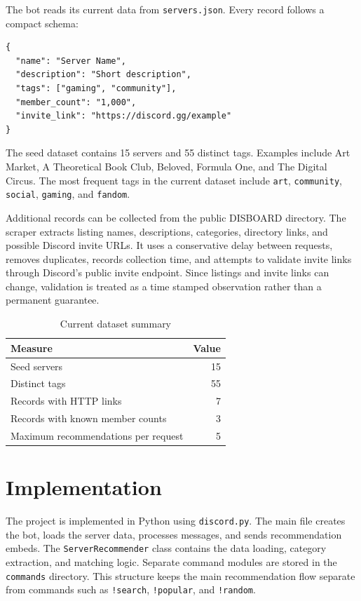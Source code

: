 \documentclass[11pt,a4paper]{article}
\begin{document}
The bot reads its current data from \texttt{servers.json}. Every record follows a compact schema:

\begin{lstlisting}
{
  "name": "Server Name",
  "description": "Short description",
  "tags": ["gaming", "community"],
  "member_count": "1,000",
  "invite_link": "https://discord.gg/example"
}
\end{lstlisting}

The seed dataset contains 15 servers and 55 distinct tags. Examples include Art Market, A Theoretical Book Club, Beloved, Formula One, and The Digital Circus. The most frequent tags in the current dataset include \texttt{art}, \texttt{community}, \texttt{social}, \texttt{gaming}, and \texttt{fandom}.

Additional records can be collected from the public DISBOARD directory. The scraper extracts listing names, descriptions, categories, directory links, and possible Discord invite URLs. It uses a conservative delay between requests, removes duplicates, records collection time, and attempts to validate invite links through Discord's public invite endpoint. Since listings and invite links can change, validation is treated as a time stamped observation rather than a permanent guarantee.

\begin{table}[ht]
    \centering
    \caption{Current dataset summary}
    \label{tab:dataset}
    \begin{tabular}{lr}
        \toprule
        Measure & Value \\
        \midrule
        Seed servers & 15 \\
        Distinct tags & 55 \\
        Records with HTTP links & 7 \\
        Records with known member counts & 3 \\
        Maximum recommendations per request & 5 \\
        \bottomrule
    \end{tabular}
\end{table}

\section{Implementation}

The project is implemented in Python using \texttt{discord.py}. The main file creates the bot, loads the server data, processes messages, and sends recommendation embeds. The \texttt{ServerRecommender} class contains the data loading, category extraction, and matching logic. Separate command modules are stored in the \texttt{commands} directory. This structure keeps the main recommendation flow separate from commands such as \texttt{!search}, \texttt{!popular}, and \texttt{!random}.
\end{document}
